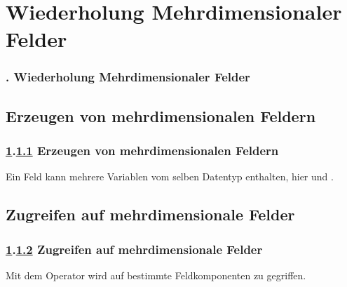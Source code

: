 \def\stitle{Wiederholung Mehrdimensionaler Felder}
\section{\stitle}\label{K:wdh}
\begin{frame}
  \frametitle{\kap. \stitle}%
\tableofcontents[current]
\end{frame}
\def\stitle{Erzeugen von mehrdimensionalen Feldern}
\subsection{\stitle}\label{S:Erzeugen}
\begin{frame}[t]%
  \frametitle{\ref{K:wdh}.\ref{S:Erzeugen} \stitle}
\medskip

Ein Feld kann mehrere Variablen vom selben Datentyp enthalten, hier  und .


\end{frame}


\def\stitle{Zugreifen auf mehrdimensionale Felder}
\subsection{\stitle}\label{S:Zugreifen}
\begin{frame}[t]%
  \frametitle{\ref{K:wdh}.\ref{S:Zugreifen} \stitle}

Mit dem Operator \code{[]} wird auf bestimmte Feldkomponenten zu gegriffen.


\end{frame}

